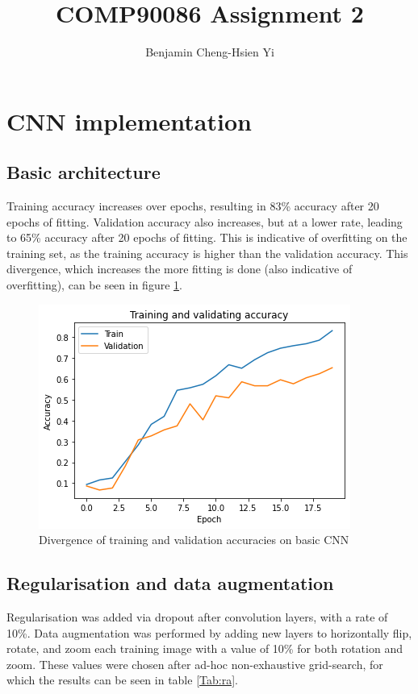 \documentclass[10pt,a4paper]{article}
\begin{document}
\title{COMP90086 Assignment 2}
\author{Benjamin Cheng-Hsien Yi}
	
\section{CNN implementation}
\subsection{Basic architecture}
Training accuracy increases over epochs, resulting in 83\% accuracy after 20 epochs of fitting. Validation accuracy also increases, but at a lower rate, leading to 65\% accuracy after 20 epochs of fitting. This is indicative of overfitting on the training set, as the training accuracy is higher than the validation accuracy. This divergence, which increases the more fitting is done (also indicative of overfitting), can be seen in figure \ref{fig:11}.

\begin{figure}[H]
	\centering
	\includegraphics[width=0.7\linewidth]{images/11}
	\caption{Divergence of training and validation accuracies on basic CNN}
	\label{fig:11}
\end{figure}

\newpage
\subsection{Regularisation and data augmentation}
Regularisation was added via dropout after convolution layers, with a rate of 10\%. Data augmentation was performed by adding new layers to horizontally flip, rotate, and zoom each training image with a value of 10\% for both rotation and zoom. These values were chosen after ad-hoc non-exhaustive grid-search, for which the results can be seen in table \ref{Tab:ra}.
\end{document}
